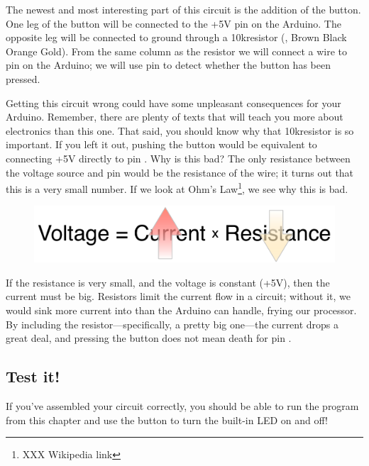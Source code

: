The newest and most interesting part of this circuit is the addition of the button. One leg of the button will be connected to the {\code +5V} pin on the Arduino. The opposite leg will be connected to ground through a 10k\ohm resistor (, Brown Black Orange Gold). From the same column as the resistor we will connect a wire to pin \pintwo on the Arduino; we will use pin \pintwo to detect whether the button has been pressed. 

Getting this circuit wrong could have some unpleasant consequences for your Arduino. Remember, there are plenty of texts that will teach you more about electronics than this one. That said, you should know why that 10k\ohm resistor is so important. If you left it out, pushing the button would be equivalent to connecting {\code +5V} directly to pin \pintwo. Why is this bad? The only resistance between the voltage source and pin \pintwo would be the resistance of the wire; it turns out that this is a very small number. If we look at Ohm's Law\footnote{XXX Wikipedia link}, we see why this is bad.


\begin{figure}[ht]
  \begin{center}
    \includegraphics[width=0.8\linewidth]{images/ch4-ohms-law}
    \label{image:ohms-law}
  \end{center}
\end{figure}

If the resistance is very small, and the voltage is constant ({\code +5V}), then the current must be big. Resistors limit the current flow in a circuit; without it, we would sink more current into \pintwo than the Arduino can handle, frying our processor. By including the resistor---specifically, a pretty big one---the current drops a great deal, and pressing the button does not mean death for pin \pintwo.

\CODE



\subsection{Test it!}
If you've assembled your circuit correctly, you should be able to run the program from this chapter and use the button to turn the built-in LED on and off!

